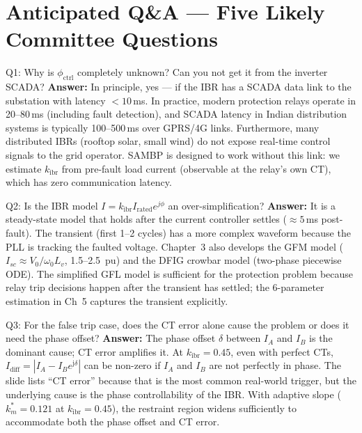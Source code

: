 \documentclass[12pt,a4paper]{article}
\newcommand{\kibr}{k_\mathrm{ibr}}
\newcommand{\Idiff}{I_\mathrm{diff}}
\newcommand{\km}{k_m}
\newcommand{\phictrl}{\phi_\mathrm{ctrl}}
\newcommand{\jj}{\mathrm{j}}
\begin{document}
\section{Anticipated Q\&A --- Five Likely Committee Questions}

\begin{keybox}{Q1: Why is $\phictrl$ completely unknown? Can you not get it from the inverter SCADA?}
\textbf{Answer:}  In principle, yes --- if the IBR has a SCADA data link to the substation
with latency $< 10\,$ms.  In practice, modern protection relays operate in 20--80\,ms
(including fault detection), and SCADA latency in Indian distribution systems is typically
100--500\,ms over GPRS/4G links.  Furthermore, many distributed IBRs (rooftop solar,
small wind) do not expose real-time control signals to the grid operator.  SAMBP is
designed to work without this link: we estimate $\kibr$ from pre-fault load current
(observable at the relay's own CT), which has zero communication latency.
\end{keybox}

\begin{keybox}{Q2: Is the IBR model $I = k_\mathrm{ibr} I_\mathrm{rated} e^{j\phi}$ an over-simplification?}
\textbf{Answer:}  It is a steady-state model that holds after the current controller
settles ($\approx 5\,$ms post-fault).  The transient (first 1--2 cycles) has a more
complex waveform because the PLL is tracking the faulted voltage.  Chapter~3 also
develops the GFM model ($I_{sc} \approx V_0 / \omega_0 L_v$, 1.5--2.5~pu) and the DFIG
crowbar model (two-phase piecewise ODE).  The simplified GFL model is sufficient for
the protection problem because relay trip decisions happen after the transient has
settled; the 6-parameter estimation in Ch~5 captures the transient explicitly.
\end{keybox}

\begin{keybox}{Q3: For the false trip case, does the CT error alone cause the problem or does it need the phase offset?}
\textbf{Answer:}  The phase offset $\delta$ between $I_A$ and $I_B$ is the dominant
cause; CT error amplifies it.  At $\kibr = 0.45$, even with perfect CTs,
$\Idiff = |I_A - I_B e^{\jj\delta}|$ can be non-zero if $I_A$ and $I_B$ are not
perfectly in phase.  The slide lists ``CT error'' because that is the most common
real-world trigger, but the underlying cause is the phase controllability of the IBR.
With adaptive slope ($\km^* = 0.121$ at $\kibr = 0.45$), the restraint region widens
sufficiently to accommodate both the phase offset and CT error.
\end{keybox}
\end{document}
